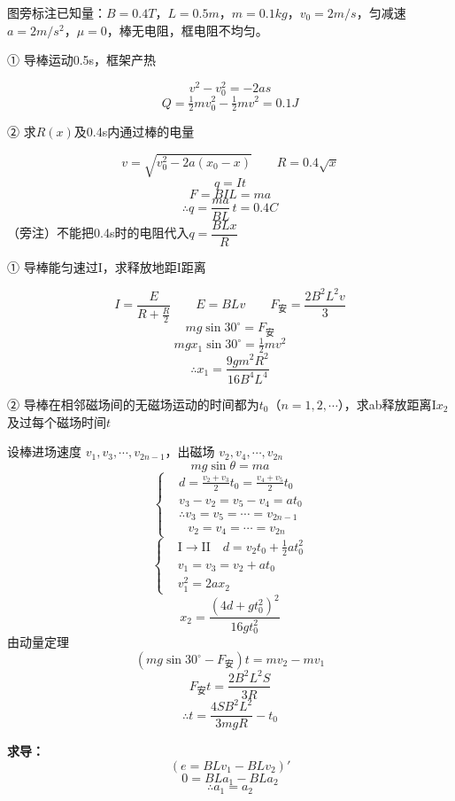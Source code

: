 \begin{problem}
图旁标注已知量：$B=0.4\unit{T}$，$L=0.5\unit{m}$，$m=0.1\unit{kg}$，$v_0=2\unit{m/s}$，匀减速 $a=2\unit{m/s^2}$，$\mu=0$，棒无电阻，框电阻不均匀。

① 导棒运动0.5s，框架产热 %
\begin{solution}
\[ v^2-v_0^2=-2as \]
\[ Q=\tfrac12mv_0^2-\tfrac12mv^2=0.1\unit{J} \]
\end{solution}
② 求$R(x)$及0.4s内通过棒的电量
\begin{solution}
\[ v=\sqrt{v_0^2-2a(x_0-x)}\qquad R=0.4\sqrt{x} \]
\[ q=It \]
\[ F=BIL=ma \]
\[ \therefore q=\frac{ma}{BL}\,t=0.4\unit{C} \]
（旁注）不能把0.4s时的电阻代入$q=\dfrac{BLx}{R}$
\end{solution}
\end{problem}
\begin{problem}
① 导棒能匀速过$\mathrm{I}$，求释放地距$\mathrm{I}$距离 %
\begin{solution}
\[ I=\frac{E}{R+\frac{R}{2}}\qquad E=BLv\qquad F_{\text{安}}=\frac{2B^2L^2v}{3} \] %
\[ mg\sin30^\circ=F_{\text{安}} \]
\[ mgx_1\sin30^\circ=\tfrac12mv^2 \]
\[ \therefore x_1=\frac{9gm^2R^2}{16B^4L^4} \]
\end{solution}
② 导棒在相邻磁场间的无磁场运动的时间都为$t_0$（$n=1,2,\cdots$），求ab释放距离$\mathrm{I}$$x_2$及过每个磁场时间$t$
\begin{solution}
设棒进场速度 $v_1,v_3,\cdots,v_{2n-1}$，出磁场 $v_2,v_4,\cdots,v_{2n}$
\[ mg\sin\theta=ma \]
\[
\left\{\begin{aligned}
&d=\frac{v_2+v_3}{2}t_0=\frac{v_4+v_5}{2}t_0\\
&v_3-v_2=v_5-v_4=at_0\\
&\therefore v_3=v_5=\cdots=v_{2n-1}\\
&\phantom{\therefore\ }v_2=v_4=\cdots=v_{2n}
\end{aligned}\right.
\]
\[
\left\{\begin{aligned}
&\mathrm{I}\to\mathrm{II}\quad d=v_2t_0+\tfrac12at_0^2\\
&v_1=v_3=v_2+at_0\\
&v_1^2=2ax_2
\end{aligned}\right.
\]
\[ x_2=\frac{(4d+gt_0^2)^2}{16gt_0^2} \]
由动量定理
\[ (mg\sin30^\circ-F_{\text{安}})t=mv_2-mv_1 \]
\[ F_{\text{安}}t=\frac{2B^2L^2S}{3R} \]
\[ \therefore t=\frac{4SB^2L^2}{3mgR}-t_0 \]
\end{solution}
\end{problem}
\textbf{求导：}
\[ (e=BLv_1-BLv_2)' \]
\[ 0=BLa_1-BLa_2 \]
\[ \therefore a_1=a_2 \]
